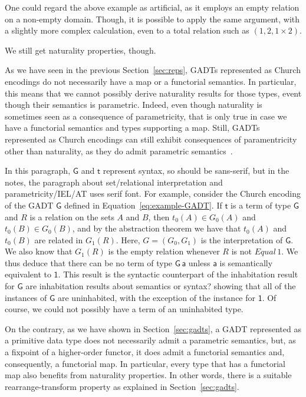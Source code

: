 \documentclass[acmsmall,screen,review,anonymous]{acmart}
\theoremstyle{definition}
\begin{document}
One could regard the above example as artificial, as it employs an
empty relation on a non-empty domain.  Though, it is possible to apply
the same argument, with a slightly more complex calculation, even to a
total relation such as $(1, 2, 1 \times 2)$.

We still get naturality properties, though.

\vspace*{0.2in}

As we have seen in the previous Section~\ref{sec:reps}, GADTs
represented as Church encodings do not necessarily have a map or a
functorial semantics.  In particular, this means that we cannot
possibly derive naturality results for those types, event though their
semantics is parametric.  Indeed, even though naturality is sometimes
seen as a consequence of parametricity, that is only true in case we
have a functorial semantics and types supporting a map.  Still, GADTs
represented as Church encodings can still exhibit consequences of
paramentricity other than naturality, as they do admit parametric
semantics~\cite{atk12}.

\begin{example}
{\color{blue} In this paragraph, $\mathsf{G}$ and $\mathsf{t}$
  represent syntax, so should be sans-serif, but in the notes, the
  paragraph about set/relational interpretation and
  parametricity/IEL/AT uses serif font.} For example, consider the
Church encoding of the GADT $\mathsf{G}$ defined in
Equation~\ref{eq:example-GADT}.  If $\mathsf{t}$ is a term of type
$\mathsf{G}$ and $R$ is a relation on the sets $A$ and $B$, then
$t_0(A) \in G_0(A)$ and $t_0(B) \in G_0(B)$, and by the abstraction
theorem we have that $t_0(A)$ and $t_0(B)$ are related in $G_1(R)$.
{\color{blue} Here, $G = (G_0,G_1)$ is the interpretation of
  $\mathsf{G}$.}  We also know that $G_1(R)$ is the empty relation
whenever $R$ is not $\mathit{Equal}\,1$.  We thus deduce that there
can be no term of type $\mathsf{G\,a}$ unless $\mathsf{a}$ is
semantically equivalent to $\mathsf{1}$.  This result is the syntactic
counterpart of the inhabitation result for $\mathsf{G}$ {\color{blue}
  are inhabitation results about semantics or syntax?}  showing that
all of the instances of $\mathsf{G}$ are uninhabited, with the
exception of the instance for $\mathsf{1}$.  Of course, we could not
possibly have a term of an uninhabited type.
\end{example}

On the contrary, as we have shown in Section~\ref{sec:gadts}, a
GADT represented as a primitive data type does not necessarily admit a
parametric semantics, but, as a fixpoint of a higher-order functor, it
does admit a functorial semantics and, consequently, a functorial map.
In particular, every type that has a functorial map also benefits from
naturality properties.  In other words, there is a suitable
rearrange-transform property as explained in Section~\ref{sec:gadts}.
\end{document}
